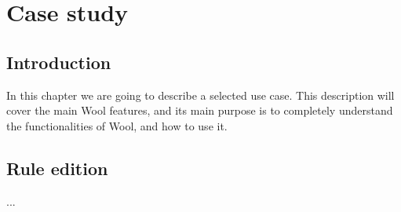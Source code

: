 \chapter{Case study}
\label{chap:case-study}

\section{Introduction}
\label{sec:introduction}
In this chapter we are going to describe a selected use case. This description will cover the main Wool features, and its main purpose is to completely understand the functionalities of Wool, and how to use it. 
\section{Rule edition}
...